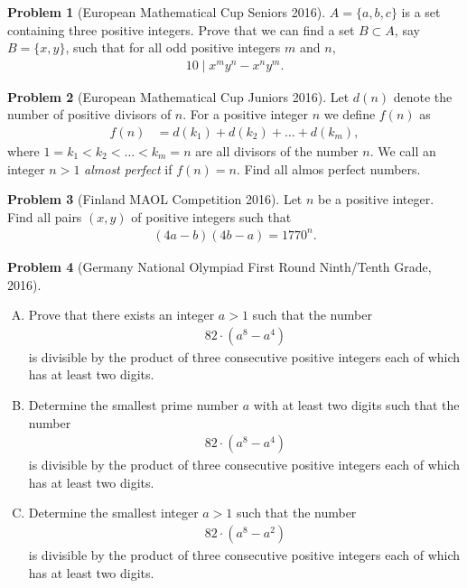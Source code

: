 \documentclass[]{article}
\theoremstyle{definition}
\newtheorem{problem}{Problem}
\begin{document}
\begin{problem}[European Mathematical Cup Seniors 2016]
	$A=\{a,b,c\}$ is a set containing three positive integers. Prove that we can find a set $B \subset A$, say $B=\{x,y\}$, such that for all odd positive integers $m$ and $n$,
		\begin{align*}
			10 \mid x^m y^n - x^n y^m.
		\end{align*}
\end{problem}



\begin{problem}[European Mathematical Cup Juniors 2016]
	Let $d(n)$ denote the number of positive divisors of $n$. For a positive integer $n$ we define $f(n)$ as
		\begin{align*}
			f(n) & = d(k_1) + d(k_2) + \dots + d(k_m),
		\end{align*}
	where $ 1=k_1 < k_2 < \dots < k_m=n$ are all divisors of the number $n$. We call an integer $n>1$ \textit{almost perfect} if $f(n)=n$. Find all almos perfect numbers.
\end{problem}



\begin{problem}[Finland MAOL Competition 2016]
	Let $n$ be a positive integer. Find all pairs $(x,y)$ of positive integers such that
		\begin{align*}
			(4a-b)(4b-a)=1770^n.
		\end{align*}
\end{problem}


\begin{problem}[Germany National Olympiad First Round Ninth/Tenth Grade, 2016]
	\begin{enumerate}[(A)]
		\item Prove that there exists an integer $a>1$ such that the number
			\begin{align*}
				82 \cdot \left(a^8 - a^4\right)
			\end{align*}
		is divisible by the product of three consecutive positive integers each of which has at least two digits.
		\item Determine the smallest prime number $a$ with at least two digits such that the number
			\begin{align*}
				82 \cdot \left(a^8 - a^4\right)
			\end{align*}
		is divisible by the product of three consecutive positive integers each of which has at least two digits.
		\item Determine the smallest integer $a>1$ such that the number
			\begin{align*}
				82 \cdot \left(a^8 - a^2\right)
			\end{align*}
		is divisible by the product of three consecutive positive integers each of which has at least two digits.
	\end{enumerate}
\end{problem}
\end{document}
